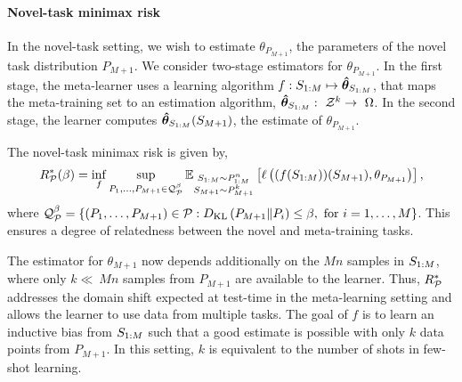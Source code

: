 \paragraph{Novel-task minimax risk} In the novel-task setting, we wish to estimate $\theta_{P_{M+1}}$, the parameters of the novel task distribution $P_{M+1}$.
We consider two-stage estimators for $\theta_{P_{M+1}}$. In the first stage, the meta-learner uses a learning algorithm $f: S_{1:M} \mapsto \bm{\hat{\theta}}_{S_{1:M}}$,  that maps the meta-training set to an estimation algorithm, $\bm{\hat{\theta}}_{S_{1:M}}:~\mathcal{Z}^k\rightarrow~\Omega$. In the second stage, the learner computes $\bm{\hat{\theta}}_{S_{1:M}}(S_{M+1})$, the estimate of $\theta_{P_{M+1}}$.

The novel-task minimax risk is given by, 
\begin{equation}\label{eqn:novel_risk}
    R^*_{\mathcal{P}}(\beta) = \inf_{f} \sup_{P_1,\ldots,P_{M+1} \in \mathcal{Q}^{\beta}_{\mathcal{P}}} \mathbb{E}_{\substack{S_{1:M}\sim P_{1:M}^n\\S_{M+1} \sim P_{M+1}^k}}\left[ \ell\left((f(S_{1:M}))(S_{M+1}), \theta_{P_{M+1}}\right) \right],
\end{equation}
where $\mathcal{Q}^{\beta}_{\mathcal{P}} = \{(P_1,\ldots,P_{M+1}) \in \mathcal{P} : D_{\mathrm{KL}}\left(P_{M+1}\Vert P_i\right) \leq \beta, \textrm{ for } i=1,\ldots,M\}$. This ensures a degree of relatedness between the novel and meta-training tasks.

The estimator for $\theta_{M+1}$ now depends additionally on the $Mn$ samples in $S_{1:M}$, where only $k\ll~Mn$ samples from $P_{M+1}$ are available to the learner. Thus, $R^*_{\mathcal{P}}$ addresses the domain shift expected at test-time in the meta-learning setting and allows the learner to use data from multiple tasks. The goal of $f$ is to learn an inductive bias from $S_{1:M}$ such that a good estimate is possible with only $k$ data points from $P_{M+1}$. In this setting, $k$ is equivalent to the number of shots in few-shot learning.

